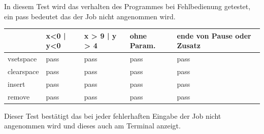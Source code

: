 In diesem Test wird das verhalten des Programmes bei Fehlbedienung getestet, ein pass bedeutet das der Job nicht angenommen wird.

\begin{tabular}{|l|l|l|l|l|}
\hline
         	&  x<0 | y<0 & x > 9 | y > 4 & ohne Param.& ende von Pause oder Zusatz\\
\hline
vsetspace & pass & pass & pass & pass \\
\hline
clearspace & pass & pass & pass & pass \\
\hline
insert & pass & pass & pass & pass \\
\hline
remove & pass & pass & pass & pass \\
\hline
\end{tabular}

Dieser Test bestätigt das bei jeder fehlerhaften Eingabe der Job nicht angenommen wird und dieses auch am Terminal anzeigt.




